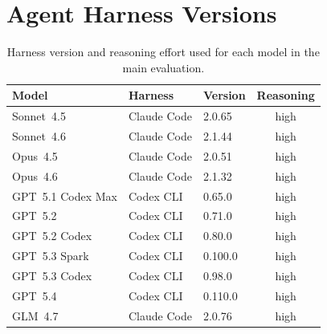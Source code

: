 \section{Agent Harness Versions}\label{sec:agent-versions}

\begin{table}[h]
\centering
\small
\begin{tabular}{lllc}
\toprule
Model & Harness & Version & Reasoning \\
\midrule
Sonnet~4.5   & Claude Code & 2.0.65 & high \\
Sonnet~4.6   & Claude Code & 2.1.44 & high \\
Opus~4.5     & Claude Code & 2.0.51 & high \\
Opus~4.6     & Claude Code & 2.1.32 & high \\
\midrule
GPT~5.1 Codex Max & Codex CLI & 0.65.0 & high \\
GPT~5.2            & Codex CLI & 0.71.0 & high \\
GPT~5.2 Codex      & Codex CLI & 0.80.0 & high \\
GPT~5.3 Spark      & Codex CLI & 0.100.0 & high \\
GPT~5.3 Codex      & Codex CLI & 0.98.0 & high \\
GPT~5.4            & Codex CLI & 0.110.0 & high \\
\midrule
GLM~4.7      & Claude Code & 2.0.76 & high \\
\bottomrule
\end{tabular}
\caption{Harness version and reasoning effort used for each model in the main evaluation.}
\label{tab:agent-versions}
\end{table}
